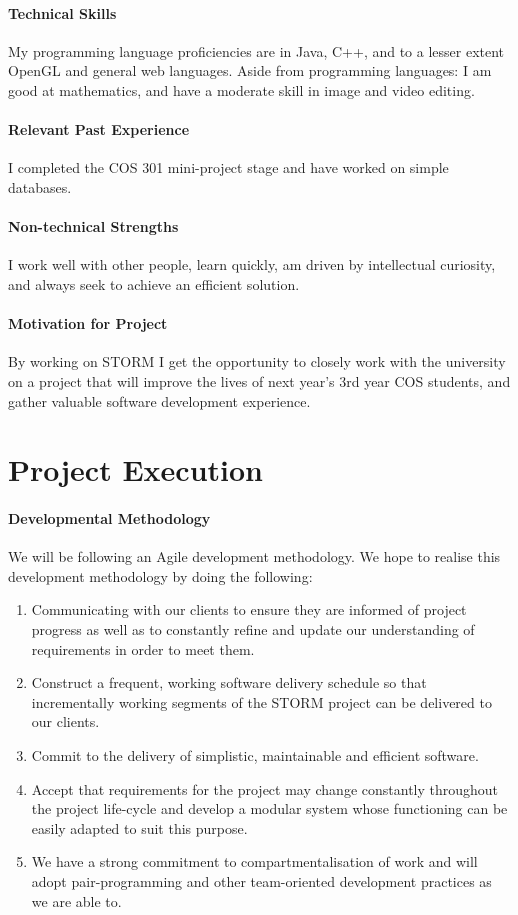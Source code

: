 \documentclass[12pt]{article}
\begin{document}
\paragraph{Technical Skills}
My programming language proficiencies are in Java, C++, and to a lesser extent OpenGL and general web languages.
Aside from programming languages: I am good at mathematics, and have a moderate skill in image and video editing.
\paragraph{Relevant Past Experience}
I completed the COS 301 mini-project stage and have worked on simple databases.
\paragraph{Non-technical Strengths}
I work well with other people, learn quickly, am driven by intellectual curiosity, and always seek to achieve an efficient solution.
\paragraph{Motivation for Project}
By working on STORM I get the opportunity to closely work with the university on a project that will improve the lives of next year's 3rd year COS students, and gather valuable software development experience.

\section{Project Execution}
\paragraph{Developmental Methodology}
We will be following an Agile development methodology. We hope to realise this development methodology by doing the following:
\begin{enumerate}
\item Communicating with our clients to ensure they are informed of project progress as well as to constantly refine and update our understanding of requirements in order to meet them.
\item Construct a frequent, working software delivery schedule so that incrementally working segments of the STORM project can be delivered to our clients.
\item Commit to the delivery of simplistic, maintainable and efficient software.
\item Accept that requirements for the project may change constantly throughout the project life-cycle and develop a modular system whose functioning can be easily adapted to suit this purpose.
\item We have a strong commitment to compartmentalisation of work and will adopt pair-programming and other team-oriented development practices as we are able to.
\end{enumerate}
\end{document}
